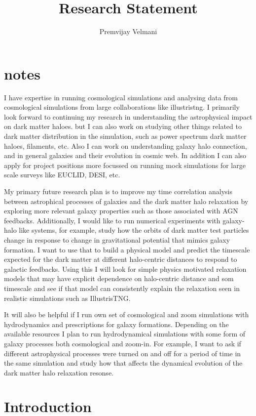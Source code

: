 \documentclass[12pt]{article}
\title{Research Statement}
\author{Premvijay Velmani}
\begin{document}
\maketitle
\section*{notes}
I have expertise in running cosmological simulations and analysing data from cosmological simulations from large collaborations like illustristng. I primarily look forward to continuing my research in understanding the astrophysical impact on dark matter haloes. but I can also work on studying other things related to dark matter distribution in the simulation, such as power spectrum dark matter haloes, filaments, etc. Also I can work on understanding galaxy halo connection, and in general galaxies and their evolution in cosmic web. In addition I can also apply for project positions more focussed on running mock simulations for large scale surveys like EUCLID, DESI, etc. 

My primary future research plan is to improve my time correlation analysis between astrophical processes of galaxies and the dark matter halo relaxation by exploring more relevant galaxy properties such as those associated with AGN feedbacks. Additionally, I would like to run numerical experiments with galaxy- halo like systems, for example, study how the orbits of dark matter test particles change in response to change in gravitational potential that mimics galaxy formation. I want to use that to build a physical model and predict the timescale expected for the dark matter at different halo-centric distances to respond to galactic feedbacks. Using this I will look for simple physics motivated relaxation models that may have explicit dependence on halo-centric distance and som timescale and see if that model can consistently explain the relaxation seen in realistic simulations such as IllustrisTNG. 

It will also be helpful if I run own set of cosmological and zoom simulations with hydrodynamics and prescriptions for galaxy formations.
Depending on the available resources I plan to run hydrodynamical simulations with some form of galaxy processes both cosmological and zoom-in. For example, I want to ask if different astrophysical processes were turned on and off for a period of time in the same simulation and study how that affects the dynamical evolution of the dark matter halo relaxation resonse.


\newpage
\section{Introduction}
\end{document}
